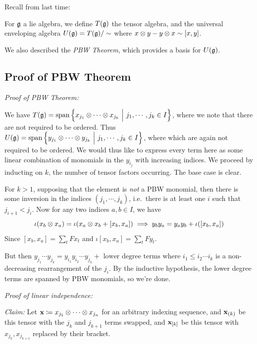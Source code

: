 Recall from last time:

For \({\mathfrak{g}}\) a lie algebra, we define \(T({\mathfrak{g}})\) the tensor algebra,
and the universal enveloping algebra \(U({\mathfrak{g}}) = T({\mathfrak{g}})/\sim\) where
\(x\otimes y - y\otimes x \sim [x, y]\).

We also described the \emph{PBW Theorem}, which provides a basis for
\(U({\mathfrak{g}})\).

\hypertarget{proof-of-pbw-theorem}{%
\subsection{Proof of PBW Theorem}\label{proof-of-pbw-theorem}}

\emph{Proof of PBW Theorem:}

We have
\(T({\mathfrak{g}}) = {\mathrm{span}}\left\{{x_{j_1} \otimes \cdots \otimes x_{j_k} {~\mathrel{\Big|}~} j_1, \cdots, j_k \in I}\right\}\),
where we note that there are not required to be ordered. Thus
\(U({\mathfrak{g}}) = {\mathrm{span}}\left\{{y_{j_1} \otimes \cdots \otimes y_{j_k} {~\mathrel{\Big|}~} j_1, \cdots, j_k \in I}\right\}\),
where which are again not required to be ordered. We would thus like to
express every term here as some linear combination of monomials in the
\(y_{i_j}\) with increasing indices. We proceed by inducting on \(k\),
the number of tensor factors occurring. The base case is clear.

For \(k> 1\), supposing that the element is \emph{not} a PBW monomial,
then there is some inversion in the indices \((j_1, \cdots, j_k)\),
i.e.~there is at least one \(i\) such that \(j_{i+1} < j_i\). Now for
any two indices \(a,b \in I\), we have \[
\iota(x_b \otimes x_a) = \iota(x_a \otimes x_b + [x_b, x_a]) \implies  y_b y_a = y_a y_b + \iota([x_b, x_a])
\] Since \([x_b, x_a] = \sum_t F x_t\) and
\(\iota[x_b, x_a] = \sum_t F y_t\).

But then
\(y_{j_1} \cdots y_{j_k} = y_{i_1} y_{i_2} \cdots y_{j_k} + \text{ lower degree terms}\)
where \(i_1 \leq i_2 \cdots i_k\) is a non-decreasing rearrangement of
the \(j_i\). By the inductive hypothesis, the lower degree terms are
spanned by PBW monomials, so we're done.

\emph{Proof of linear independence:}

\emph{Claim:} Let
\(\mathbf{x} \coloneqq x_{j_1} \otimes \cdots \otimes x_{j_n}\) for an
arbitrary indexing sequence, and \(\mathbf{x}_{(k)}\) be this tensor with
the \(j_k\) and \(j_{k+1}\) terms swapped, and \(\mathbf{x}_{[k]}\) be
this tensor with \(x_{j_k}, x_{j_{k+1}}\) replaced by their bracket.

